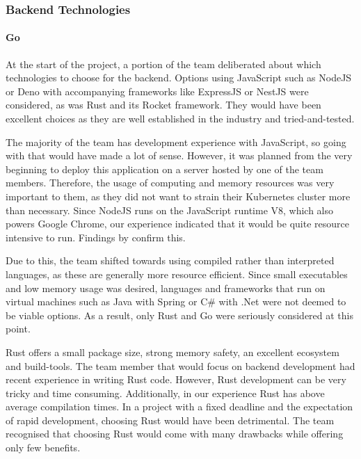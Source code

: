 \subsubsection{Backend Technologies}
\paragraph{Go}
At the start of the project, a portion of the team deliberated about which
technologies to choose for the backend. Options using JavaScript such as NodeJS
or Deno with accompanying frameworks like ExpressJS or NestJS were considered,
as was Rust and its Rocket framework. They would have been excellent choices as
they are well established in the industry and tried-and-tested.

The majority of the team has development experience with JavaScript, so going
with that would have made a lot of sense. However, it was planned from the very
beginning to deploy this application on a server hosted by one of the team
members. Therefore, the usage of computing and memory resources was very
important to them, as they did not want to strain their Kubernetes cluster more
than necessary. Since NodeJS runs on the JavaScript runtime V8, which also
powers Google Chrome, our experience indicated that it would be quite resource
intensive to run. Findings by \textcite{Tanadechopon2023} confirm this.

Due to this, the team shifted towards using compiled rather than interpreted
languages, as these are generally more resource efficient. Since small
executables and low memory usage was desired, languages and frameworks that run
on virtual machines such as Java with Spring or C\# with .Net were not deemed to
be viable options. As a result, only Rust and Go were seriously considered at
this point.

Rust offers a small package size, strong memory safety, an excellent
ecosystem and build-tools. The team member that would focus on backend
development had recent experience in writing Rust code. However, Rust
development can be very tricky and time consuming. Additionally, in our
experience Rust has above average compilation times. In a project with a fixed
deadline and the expectation of rapid development, choosing Rust would have been
detrimental. The team recognised that choosing Rust would come with many
drawbacks while offering only few benefits.

